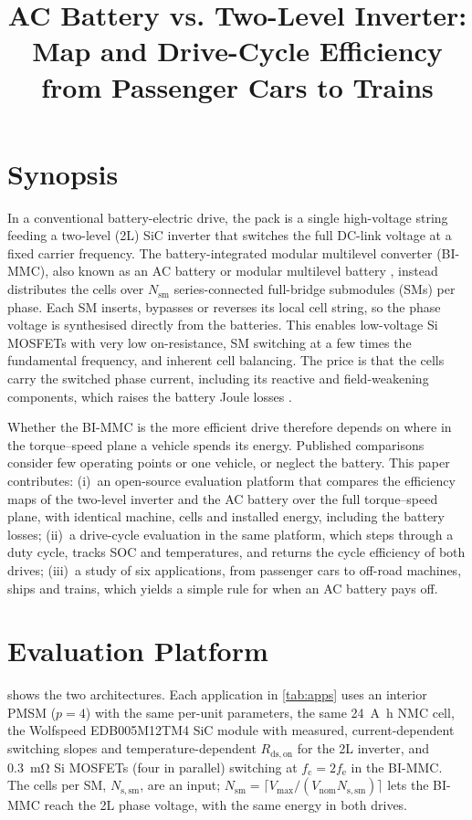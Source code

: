 \documentclass{PCIM-Abstract}
\title{AC Battery vs. Two-Level Inverter: Map and Drive-Cycle Efficiency from Passenger Cars to Trains}
\begin{document}
\printtitle

\section{Synopsis}
In a conventional battery-electric drive, the pack is a single high-voltage string feeding a two-level (2L) SiC inverter that switches the full DC-link voltage at a fixed carrier frequency. The battery-integrated modular multilevel converter (BI-MMC), also known as an AC battery or modular multilevel battery \cite{lesnicar2003,helling2016,quraan2016}, instead distributes the cells over $N_\mathrm{sm}$ series-connected full-bridge submodules (SMs) per phase. Each SM inserts, bypasses or reverses its local cell string, so the phase voltage is synthesised directly from the batteries. This enables low-voltage Si MOSFETs with very low on-resistance, SM switching at a few times the fundamental frequency, and inherent cell balancing. The price is that the cells carry the switched phase current, including its reactive and field-weakening components, which raises the battery Joule losses \cite{kersten2019}.

Whether the BI-MMC is the more efficient drive therefore depends on where in the torque--speed plane a vehicle spends its energy. Published comparisons consider few operating points or one vehicle, or neglect the battery. This paper contributes:
(i)~an open-source evaluation platform that compares the efficiency maps of the two-level inverter and the AC battery over the full torque--speed plane, with identical machine, cells and installed energy, including the battery losses;
(ii)~a drive-cycle evaluation in the same platform, which steps through a duty cycle, tracks SOC and temperatures, and returns the cycle efficiency of both drives;
(iii)~a study of six applications, from passenger cars to off-road machines, ships and trains, which yields a simple rule for when an AC battery pays off.

\section{Evaluation Platform}
 shows the two architectures. Each application in \cref{tab:apps} uses an interior PMSM ($p=4$) with the same per-unit parameters, the same \SI{24}{\ampere\hour} NMC cell, the Wolfspeed EDB005M12TM4 SiC module \cite{wolfspeed_edb005} with measured, current-dependent switching slopes and temperature-dependent $R_\mathrm{ds,on}$ for the 2L inverter, and \SI{0.3}{\milli\ohm} Si MOSFETs (four in parallel) switching at $f_\mathrm{c}=2f_\mathrm{e}$ in the BI-MMC. The cells per SM, $N_\mathrm{s,sm}$, are an input; $N_\mathrm{sm}=\lceil V_\mathrm{max}/(V_\mathrm{nom}N_\mathrm{s,sm})\rceil$ lets the BI-MMC reach the 2L phase voltage, with the same energy in both drives.
\end{document}
